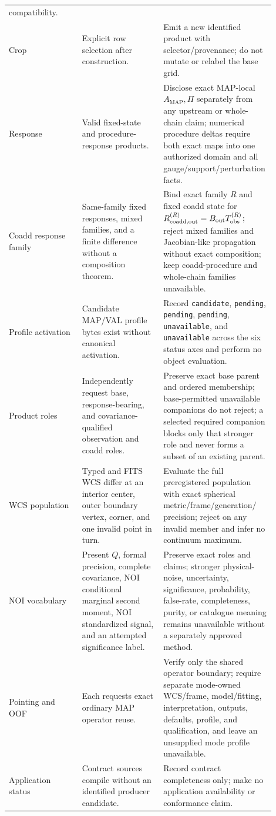 \documentclass[10pt]{article}
\begin{document}
\begin{longtable}{L{0.27\linewidth}L{0.30\linewidth}L{0.33\linewidth}}
compatibility.\\
Crop & Explicit row selection after construction. & Emit a new identified
product with selector/provenance; do not mutate or relabel the base grid.\\
Response & Valid fixed-state and procedure-response products. & Disclose exact
MAP-local \(A_{\mathrm{MAP}},\Pi\) separately from any upstream or whole-chain
claim; numerical procedure deltas require both exact maps into one authorized
\SCIMapComparisonSpaceRecordId{} domain and all
gauge/support/perturbation facts.\\
Coadd response family & Same-family fixed responses, mixed families, and a
finite difference without a composition theorem. & Bind exact family \(R\) and
fixed coadd state for \(R_{\rm coadd,out}^{(R)}=B_{\rm out}T_{\rm obs}^{(R)}\);
reject mixed families and Jacobian-like propagation without exact composition;
keep coadd-procedure and whole-chain families unavailable.\\
Profile activation & Candidate MAP/VAL profile bytes exist without canonical
activation. & Record \texttt{candidate}, \texttt{pending}, \texttt{pending},
\texttt{pending}, \texttt{unavailable}, and \texttt{unavailable} across the
six status axes and perform no object evaluation.\\
Product roles & Independently request base, response-bearing, and
covariance-qualified observation and coadd roles. & Preserve exact base parent
and ordered membership; base-permitted unavailable companions do not reject;
a selected required companion blocks only that stronger role and never forms a
subset of an existing parent.\\
WCS population & Typed and FITS WCS differ at an interior center, outer
boundary vertex, corner, and one invalid point in turn. & Evaluate the full
preregistered population with exact spherical metric/frame/generation/
precision; reject on any invalid member and infer no continuum maximum.\\
NOI vocabulary & Present \(Q\), formal precision, complete covariance, NOI
conditional marginal second moment, NOI standardized signal, and an attempted
significance label. & Preserve exact roles and claims; stronger physical-noise,
uncertainty, significance, probability, false-rate, completeness, purity, or
catalogue meaning remains unavailable without a separately approved method.\\
Pointing and OOF & Each requests exact ordinary MAP operator reuse. & Verify
only the shared operator boundary; require separate mode-owned WCS/frame,
model/fitting, interpretation, outputs, defaults, profile, and qualification,
and leave an unsupplied mode profile unavailable.\\
Application status & Contract sources compile without an identified producer
candidate. & Record contract completeness only; make no application
availability or conformance claim.\\
\bottomrule
\end{longtable}
\end{document}
